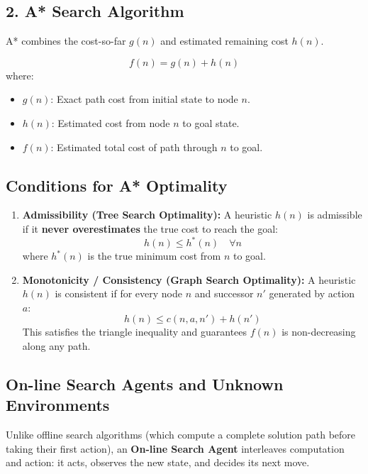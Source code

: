 \documentclass[12pt,a4paper]{article}
\begin{document}
\subsection{2. A* Search Algorithm}
A* combines the cost-so-far $g(n)$ and estimated remaining cost $h(n)$.

\begin{tcolorbox}[formulabox, title={A* Evaluation Function}]
  \begin{equation}
    f(n) = g(n) + h(n)
  \end{equation}
  where:
  \begin{itemize}[leftmargin=*, noitemsep]
    \item $g(n)$: Exact path cost from initial state to node $n$.
    \item $h(n)$: Estimated cost from node $n$ to goal state.
    \item $f(n)$: Estimated total cost of path through $n$ to goal.
  \end{itemize}
\end{tcolorbox}

\subsection{Conditions for A* Optimality}
\begin{enumerate}[leftmargin=*, itemsep=4pt]
  \item \textbf{Admissibility (Tree Search Optimality):}
    A heuristic $h(n)$ is admissible if it \textbf{never overestimates} the true cost to reach the goal:
    \begin{equation}
      h(n) \le h^*(n) \quad \forall n
    \end{equation}
    where $h^*(n)$ is the true minimum cost from $n$ to goal.
  
  \item \textbf{Monotonicity / Consistency (Graph Search Optimality):}
    A heuristic $h(n)$ is consistent if for every node $n$ and successor $n'$ generated by action $a$:
    \begin{equation}
      h(n) \le c(n, a, n') + h(n')
    \end{equation}
    This satisfies the triangle inequality and guarantees $f(n)$ is non-decreasing along any path.
\end{enumerate}

\subsection{On-line Search Agents and Unknown Environments}
Unlike offline search algorithms (which compute a complete solution path before taking their first action), an \textbf{On-line Search Agent} interleaves computation and action: it acts, observes the new state, and decides its next move.
\end{document}
